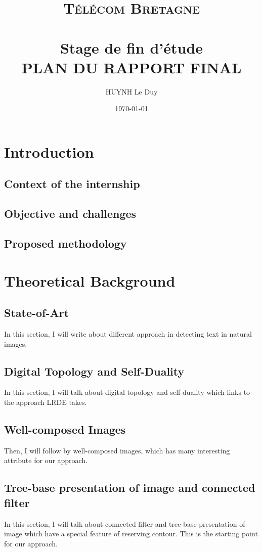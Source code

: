 \documentclass[12pt,a4paper]{article}
\title{	
\normalfont \normalsize 
\textsc{Télécom Bretagne} \\ [25pt] %
\horrule{0.5pt} \\[0.4cm] %
\huge Stage de fin d'étude \\ %
\textsc{PLAN DU RAPPORT FINAL}
\horrule{2pt} \\[0.5cm] %
}
\author{HUYNH Le Duy} %
\date{\normalsize\today} %
\begin{document}
\maketitle %
\section{Introduction}
\subsection{Context of the internship}
\subsection{Objective and challenges}
\subsection{Proposed methodology}
\section{Theoretical Background}
\subsection{State-of-Art}
In this section, I will write about different approach in detecting text in natural images.
\subsection{Digital Topology and Self-Duality}
In this section, I will talk about digital topology and self-duality which links to the approach LRDE takes.
\subsection{Well-composed Images}
Then, I will follow by well-composed images, which has many interesting attribute for our approach.
\subsection{Tree-base presentation of image and connected filter}
In this section, I will talk about connected filter and tree-base presentation of image which have a special feature of reserving contour. This is the starting point for our approach. 
\end{document}
